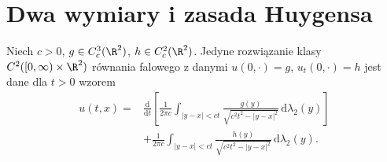 \section{Dwa wymiary i zasada Huygensa}
\label{sec:pde5-huygens}

\begin{twierdzenie}
\label{thm:pde5-2d}
Niech $c>0$, $g\in C_c^3(\R^2)$, $h\in C_c^2(\R^2)$.
Jedyne rozwiązanie klasy $C^2([0,\infty)\times\R^2)$
równania falowego z danymi $u(0,\cdot)=g$,
$u_t(0,\cdot)=h$ jest dane dla $t>0$ wzorem
\begin{equation}\label{eq:pde5-2d}
\begin{aligned}
 u(t,x)={}&\frac{\mathrm d}{\mathrm dt}
 \left[\frac1{2\pi c}\int_{|y-x|<ct}
 \frac{g(y)}{\sqrt{c^2t^2-|y-x|^2}}\,
 \mathrm d\lambda_2(y)\right]\\
 &+\frac1{2\pi c}\int_{|y-x|<ct}
 \frac{h(y)}{\sqrt{c^2t^2-|y-x|^2}}\,
 \mathrm d\lambda_2(y).
\end{aligned}
\end{equation}
\end{twierdzenie}
